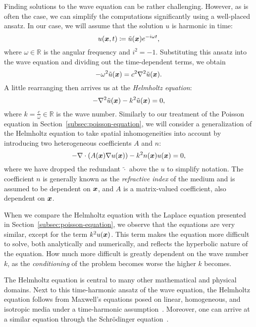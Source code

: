 Finding solutions to the wave equation can be rather challenging.
However, as is often the case, we can simplify the computations significantly using a well-placed ansatz.
In our case, we will assume that the solution $u$ is harmonic in time:
\begin{equation*}
    u({{\bm{x}}}, t) \coloneqq \tilde{u}({{\bm{x}}})e^{-i\omega t},
\end{equation*}
where $\omega\in\mathbb{R}$ is the angular frequency and $i^2=-1$.
Substituting this ansatz into the wave equation and dividing out the time-dependent terms, we obtain
\begin{equation*}
    -\omega^2 \tilde{u}({{\bm{x}}}) = c^2 \nabla^2 \tilde{u}({{\bm{x}}}).
\end{equation*}
A little rearranging then arrives us at the \emph{Helmholtz equation}:
\begin{equation*}
    -\nabla^2 \tilde{u}({{\bm{x}}})-k^2\tilde{u}({{\bm{x}}}) = 0,
\end{equation*}
where $k=\frac{c}{\omega}\in\mathbb{R}$ is the wave number.
Similarly to our treatment of the Poisson equation in Section~\ref{subsec:poisson-equation}, we will consider a generalization of the Helmholtz equation to take spatial inhomogeneities into account by introducing two heterogeneous coefficients $A$ and $n$:
\begin{equation*}
    -\nabla \cdot \left( A({{\bm{x}}}) \nabla u({{\bm{x}}}) \right)-k^2 n({{\bm{x}}})u({{\bm{x}}}) = 0,
\end{equation*}
where we have dropped the redundant $\tilde{\cdot}$ above the $u$ to simplify notation.
The coefficient $n$ is generally known as the \emph{refractive index} of the medium and is assumed to be dependent on ${{\bm{x}}}$, and $A$ is a matrix-valued coefficient, also dependent on ${{\bm{x}}}$.

When we compare the Helmholtz equation with the Laplace equation presented in Section~\ref{subsec:poisson-equation}, we observe that the equations are very similar, except for the term $k^{2}u({{\bm{x}}})$.
This term makes the equation more difficult to solve, both analytically and numerically, and reflects the hyperbolic nature of the equation.
How much more difficult is greatly dependent on the wave number $k$, as the \emph{conditioning} of the problem becomes worse the higher $k$ becomes.

The Helmholtz equation is central to many other mathematical and physical domains.
Next to this time-harmonic ansatz of the wave equation, the Helmholtz equation follows from Maxwell's equations posed on linear, homogeneous, and isotropic media under a time-harmonic assumption~\cite[Chapter~2]{maier2007}.
Moreover, one can arrive at a similar equation through the Schrödinger equation~\cite[Chapter 10]{griffiths2018}.


